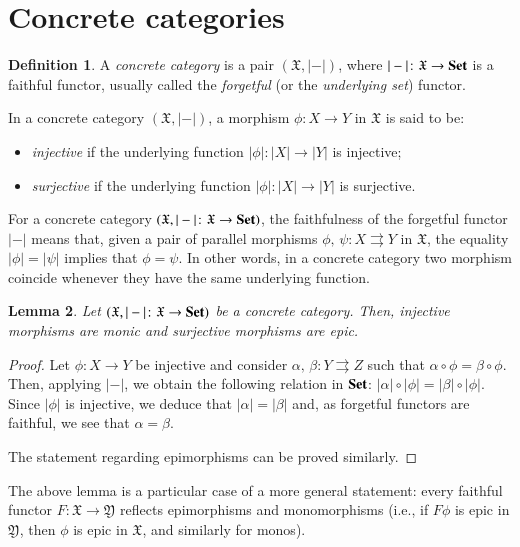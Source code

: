 \documentclass[12pt]{article}
\newtheorem{lemma}{Lemma}[section]
\theoremstyle{definition}
\newtheorem{definition}[lemma]{Definition}
\def\X{\mathfrak X}
\def\Y{\mathfrak Y}
\newcommand{\Set}{\textbf{\textup{Set}}}
\numberwithin{equation}{section}
\begin{document}
\iffalse 

\section{Concrete categories}

\begin{definition}
A {\em concrete category} is a pair $(\X,|-|)$, where $|-|\colon \X\to \Set$ is a faithful functor, usually called the \emph{forgetful} (or the \emph{underlying set}) functor. 

In a concrete category $(\X,|-|)$, a morphism $\phi\colon X\to Y$ in $\X$ is said to be:
\begin{itemize}
\item {\em injective} if the underlying function $|\phi|\colon |X|\to |Y|$ is injective;
\item {\em surjective} if the underlying function $|\phi|\colon |X|\to |Y|$ is surjective.
\end{itemize}
\end{definition}

For a concrete category  $(\X,|-|\colon \X\to \Set)$, the faithfulness of the forgetful functor $|-|$ means that, given a pair of parallel morphisms $\phi,\, \psi\colon X\rightrightarrows Y$ in $\X$, the equality $|\phi|=|\psi|$ implies that $\phi=\psi$. In other words, in a concrete category two morphism coincide whenever they have the same underlying function.

\begin{lemma}\label{inj->mono_lemma}
Let $(\X,|-|\colon \X\to \Set)$ be a concrete category. Then, injective morphisms are monic and surjective morphisms are epic.
\end{lemma}
\begin{proof}
Let $\phi\colon X\to Y$ be injective and consider $\alpha,\,\beta\colon Y\rightrightarrows Z$ such that $\alpha\circ\phi=\beta\circ\phi$. Then, applying $|-|$, we obtain the following relation in $\Set$: $|\alpha|\circ|\phi|=|\beta|\circ|\phi|$. Since $|\phi|$ is injective, we deduce that $|\alpha|=|\beta|$ and, as forgetful functors are faithful, we see that $\alpha=\beta$.

The statement regarding epimorphisms can be proved similarly.
\end{proof}

The above lemma is a particular case of a more general statement: every faithful functor  $F\colon \X \to \Y$ reflects 
epimorphisms and monomorphisms (i.e., if $F\phi$ is epic in $\Y$, then $\phi$ is epic in $\X$, and similarly for monos).
\end{document}
